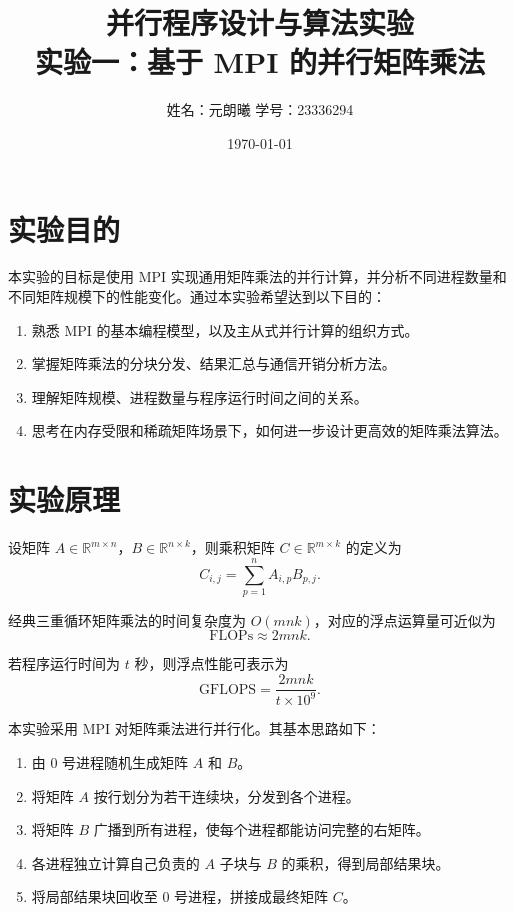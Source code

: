 \documentclass[12pt,a4paper]{ctexart}
\title{并行程序设计与算法实验\\实验一：基于 MPI 的并行矩阵乘法}
\author{姓名：元朗曦 \quad 学号：23336294}
\date{\today}
\begin{document}
\maketitle

\section{实验目的}
本实验的目标是使用 MPI 实现通用矩阵乘法的并行计算，并分析不同进程数量和不同矩阵规模下的性能变化。通过本实验希望达到以下目的：
\begin{enumerate}[itemsep=0.3em]
  \item 熟悉 MPI 的基本编程模型，以及主从式并行计算的组织方式。
  \item 掌握矩阵乘法的分块分发、结果汇总与通信开销分析方法。
  \item 理解矩阵规模、进程数量与程序运行时间之间的关系。
  \item 思考在内存受限和稀疏矩阵场景下，如何进一步设计更高效的矩阵乘法算法。
\end{enumerate}

\section{实验原理}
设矩阵 $A \in \mathbb{R}^{m \times n}$，$B \in \mathbb{R}^{n \times k}$，则乘积矩阵 $C \in \mathbb{R}^{m \times k}$ 的定义为
\begin{equation}
C_{i,j} = \sum_{p=1}^{n} A_{i,p} B_{p,j}.
\end{equation}

经典三重循环矩阵乘法的时间复杂度为 $O(mnk)$，对应的浮点运算量可近似为
\begin{equation}
\text{FLOPs} \approx 2mnk.
\end{equation}

若程序运行时间为 $t$ 秒，则浮点性能可表示为
\begin{equation}
\text{GFLOPS} = \frac{2mnk}{t \times 10^9}.
\end{equation}

本实验采用 MPI 对矩阵乘法进行并行化。其基本思路如下：
\begin{enumerate}[itemsep=0.3em]
  \item 由 0 号进程随机生成矩阵 $A$ 和 $B$。
  \item 将矩阵 $A$ 按行划分为若干连续块，分发到各个进程。
  \item 将矩阵 $B$ 广播到所有进程，使每个进程都能访问完整的右矩阵。
  \item 各进程独立计算自己负责的 $A$ 子块与 $B$ 的乘积，得到局部结果块。
  \item 将局部结果块回收至 0 号进程，拼接成最终矩阵 $C$。
\end{enumerate}
\end{document}
